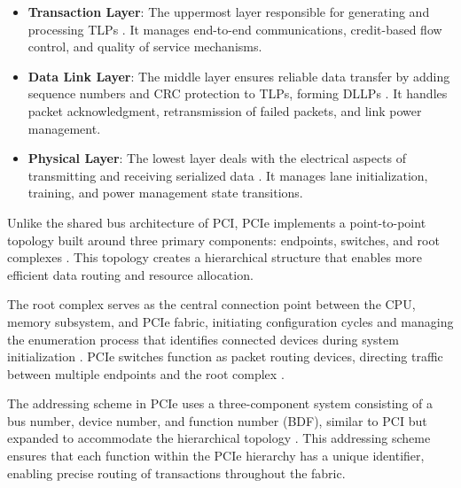 \begin{itemize}
    \item \textbf{Transaction Layer}: The uppermost layer responsible for generating 
    and processing \ac{TLP}s \parencite{budruk2003pci}. It manages end-to-end 
    communications, credit-based flow control, and quality of service mechanisms.
    \item \textbf{Data Link Layer}: The middle layer ensures reliable data transfer 
    by adding sequence numbers and \ac{CRC} protection to \ac{TLP}s, forming 
    \ac{DLLP}s \parencite{wilen2003understanding}. It handles packet 
    acknowledgment, retransmission of failed packets, and link power management.
    \item \textbf{Physical Layer}: The lowest layer deals with the electrical 
    aspects of transmitting and receiving serialized data \parencite{budruk2003pci}. 
    It manages lane initialization, training, and power management state transitions.
\end{itemize}

Unlike the shared bus architecture of \ac{PCI}, \ac{PCIe} implements 
a point-to-point topology built around three primary components: endpoints, 
switches, and root complexes \parencite{solari2005pci}. 
This topology creates a hierarchical structure that enables more 
efficient data routing and resource allocation.

The root complex serves as the central connection point between 
the \ac{CPU}, memory subsystem, and \ac{PCIe} fabric, initiating 
configuration cycles and managing the enumeration process that 
identifies connected devices during system initialization 
\parencite{budruk2003pci}. \ac{PCIe} switches 
function as packet routing devices, directing traffic between 
multiple endpoints and the root complex \parencite{wilen2003understanding}.

The addressing scheme in \ac{PCIe} uses a three-component system 
consisting of a bus number, device number, and function number 
(\ac{BDF}), similar to \ac{PCI} but expanded to accommodate the 
hierarchical topology \parencite{solari2005pci}. 
This addressing scheme ensures that each function within the 
\ac{PCIe} hierarchy has a unique identifier, enabling precise 
routing of transactions throughout the fabric.